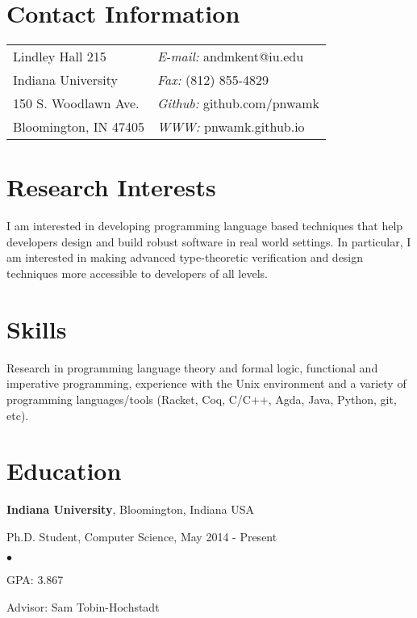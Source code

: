\documentclass[margin,line]{res}
\newenvironment{list1}{
  \begin{list}{\ding{113}}{%
      \setlength{\itemsep}{0in}
      \setlength{\parsep}{0in} \setlength{\parskip}{0in}
      \setlength{\topsep}{0in} \setlength{\partopsep}{0in} 
      \setlength{\leftmargin}{0.17in}}}{\end{list}}
\newenvironment{list2}{
  \begin{list}{$\bullet$}{%
      \setlength{\itemsep}{0in}
      \setlength{\parsep}{0in} \setlength{\parskip}{0in}
      \setlength{\topsep}{0in} \setlength{\partopsep}{0in} 
      \setlength{\leftmargin}{0.2in}}}{\end{list}}
\begin{document}

\begin{resume}
\section{\sc Contact Information}
\vspace{.05in}
\begin{tabular}{@{}p{2in}p{4in}}
Lindley Hall 215           & {\it E-mail:} andmkent@iu.edu \\
Indiana University         & {\it Fax:}  (812) 855-4829 \\
150 S. Woodlawn Ave.       & {\it Github:} github.com/pnwamk  \\       
Bloomington, IN 47405      & {\it WWW:} pnwamk.github.io \\     
\end{tabular}


\section{\sc Research Interests}
I am interested in developing programming language based techniques
that help developers design and build robust software in real world
settings.  In particular, I am interested in making advanced
type-theoretic verification and design techniques more accessible to
developers of all levels.

\section{\sc Skills}
Research in programming language theory and formal logic, functional
and imperative programming, experience with the Unix environment and a
variety of programming languages/tools (Racket, Coq, C/C++, Agda,
Java, Python, git, etc).

\section{\sc Education}
{\bf Indiana University}, Bloomington, Indiana USA\\
\vspace*{-.1in}
\begin{list1}
\item[] Ph.D. Student, Computer Science, May 2014 - Present
\begin{list2}
  \vspace*{.05in}
  \item[] GPA:  3.867
\item[] Advisor:  Sam Tobin-Hochstadt
\end{list2}
\end{list1}


\end{resume}
\end{document}
